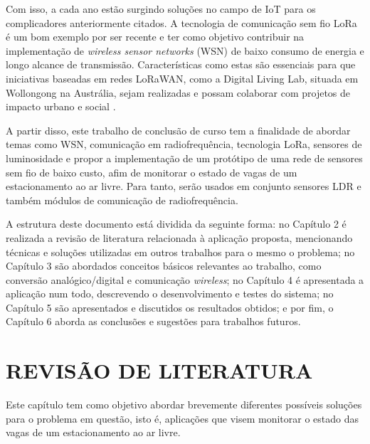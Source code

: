 \documentclass[oneside,openright,12pt]{ufsm_2015} %
\begin{document}
{Com isso, a cada ano estão surgindo soluções no campo de IoT para os complicadores anteriormente citados. A tecnologia de comunicação sem fio LoRa é um bom exemplo por ser recente e ter como objetivo contribuir na implementação de \textit{wireless sensor networks} (WSN) de baixo consumo de energia e longo alcance de transmissão. Características como estas são essenciais para que iniciativas baseadas em redes LoRaWAN, como a Digital Living Lab, situada em Wollongong na Austrália, sejam realizadas e possam colaborar com projetos de impacto urbano e social \cite{site:dll}. 


A partir disso, este trabalho de conclusão de curso tem a finalidade de abordar temas como WSN, comunicação em radiofrequência, tecnologia LoRa, sensores de luminosidade e propor a implementação de um protótipo de uma rede de sensores sem fio de baixo custo, afim de monitorar o estado de vagas de um estacionamento ao ar livre. Para tanto, serão usados em conjunto sensores LDR e também módulos de comunicação de radiofrequência.

A estrutura deste documento está dividida da seguinte forma: no Capítulo 2 é realizada a revisão de literatura relacionada à aplicação proposta, mencionando técnicas e soluções utilizadas em outros trabalhos para o mesmo o problema; no Capítulo 3 são abordados conceitos básicos relevantes ao trabalho, como conversão analógico/digital e comunicação \textit{wireless}; no Capítulo 4 é apresentada a aplicação num todo, descrevendo o desenvolvimento e testes do sistema; no Capítulo 5 são apresentados e discutidos os resultados obtidos; e por fim, o Capítulo 6 aborda as conclusões e sugestões para trabalhos futuros.
}%
\geraintro  %
\chapter{REVISÃO DE LITERATURA}
Este capítulo tem como objetivo abordar brevemente diferentes possíveis soluções para o problema em questão, isto é, aplicações que visem monitorar o estado das vagas de um estacionamento ao ar livre.
\end{document}
